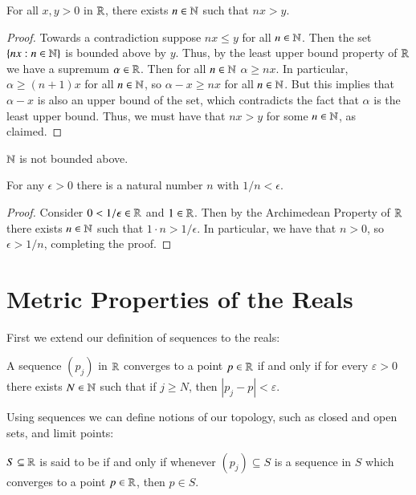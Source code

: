 \begin{thm}
    For all $x,y > 0$ in $\mathbb R$, there exists $n \in \mathbb N$ such that $nx > y$.
\end{thm}
\begin{proof}
    Towards a contradiction suppose $nx \leq y$ for all $n \in \mathbb N$. Then the set $\{nx: n \in \mathbb N\}$ is bounded above by $y$. Thus, by the least upper bound property of $\mathbb R$ we have a supremum $\alpha \in \mathbb R$. Then for all $n \in \mathbb N$ $\alpha \geq nx$. In particular, $\alpha \geq (n+1)x$ for all $n \in \mathbb N$, so $\alpha - x \geq nx$ for all $n \in \mathbb N$. But this implies that $\alpha - x$ is also an upper bound of the set, which contradicts the fact that $\alpha$ is the least upper bound. Thus, we must have that $nx > y$ for some $n \in \mathbb N$, as claimed.
\end{proof}

\begin{cor}
    $\mathbb N$ is not bounded above.
\end{cor}


\begin{cor}
    For any $\epsilon > 0$ there is a natural number $n$ with $1/n < \epsilon$.
\end{cor}
\begin{proof}
    Consider $0<1/\epsilon \in \mathbb R$ and $1 \in \mathbb R$. Then by the Archimedean Property of $\mathbb R$ there exists $n \in \mathbb N$ such that $1\cdot n > 1/\epsilon$. In particular, we have that $n > 0$, so $\epsilon > 1/n$, completing the proof.
\end{proof}


\section{Metric Properties of the Reals}

First we extend our definition of sequences to the reals:

\begin{defn}
    A sequence $(p_j)$ in $\mathbb R$ converges to a point $p \in \mathbb R$ if and only if for every $\varepsilon > 0$ there exists $N \in \mathbb N$ such that if $j \geq N$, then $|p_j - p| < \varepsilon$.
\end{defn}

Using sequences we can define notions of our topology, such as closed and open sets, and limit points:

\begin{defn}
    $S \subseteq \mathbb R$ is said to be  if and only if whenever $(p_j) \subseteq S$ is a sequence in $S$ which converges to a point $p \in \mathbb R$, then $p \in S$.
\end{defn}

